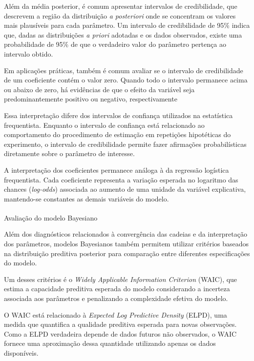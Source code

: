 \documentclass[
  brazilian,
  12pt,
  letterpaper,
  DIV=11,
  numbers=noendperiod]{scrartcl}
\makeatletter
\let\oldparagraph\paragraph
\renewcommand{\paragraph}{
    \@ifstar
      \xxxParagraphStar
      \xxxParagraphNoStar
  }
\newcommand{\xxxParagraphStar}[1]{\oldparagraph*{#1}\mbox{}}
\newcommand{\xxxParagraphNoStar}[1]{\oldparagraph{#1}\mbox{}}
\makeatother
\begin{document}
Além da média posterior, é comum apresentar intervalos de credibilidade,
que descrevem a região da distribuição \emph{a posteriori} onde se
concentram os valores mais plausíveis para cada parâmetro. Um intervalo
de credibilidade de 95\% indica que, dadas as distribuições \emph{a
priori} adotadas e os dados observados, existe uma probabilidade de 95\%
de que o verdadeiro valor do parâmetro pertença ao intervalo obtido.

Em aplicações práticas, também é comum avaliar se o intervalo de
credibilidade de um coeficiente contém o valor zero. Quando todo o
intervalo permanece acima ou abaixo de zero, há evidências de que o
efeito da variável seja predominantemente positivo ou negativo,
respectivamente

Essa interpretação difere dos intervalos de confiança utilizados na
estatística frequentista. Enquanto o intervalo de confiança está
relacionado ao comportamento do procedimento de estimação em repetições
hipotéticas do experimento, o intervalo de credibilidade permite fazer
afirmações probabilísticas diretamente sobre o parâmetro de interesse.

A interpretação dos coeficientes permanece análoga à da regressão
logística frequentista. Cada coeficiente representa a variação esperada
no logaritmo das chances (\emph{log-odds}) associada ao aumento de uma
unidade da variável explicativa, mantendo-se constantes as demais
variáveis do modelo.

\paragraph{Avaliação do modelo
Bayesiano}\label{avaliauxe7uxe3o-do-modelo-bayesiano}

Além dos diagnósticos relacionados à convergência das cadeias e da
interpretação dos parâmetros, modelos Bayesianos também permitem
utilizar critérios baseados na distribuição preditiva posterior para
comparação entre diferentes especificações do modelo.

Um desses critérios é o \emph{Widely Applicable Information Criterion}
(WAIC), que estima a capacidade preditiva esperada do modelo
considerando a incerteza associada aos parâmetros e penalizando a
complexidade efetiva do modelo.

O WAIC está relacionado à \emph{Expected Log Predictive Density} (ELPD),
uma medida que quantifica a qualidade preditiva esperada para novas
observações. Como a ELPD verdadeira depende de dados futuros não
observados, o WAIC fornece uma aproximação dessa quantidade utilizando
apenas os dados disponíveis.
\end{document}
